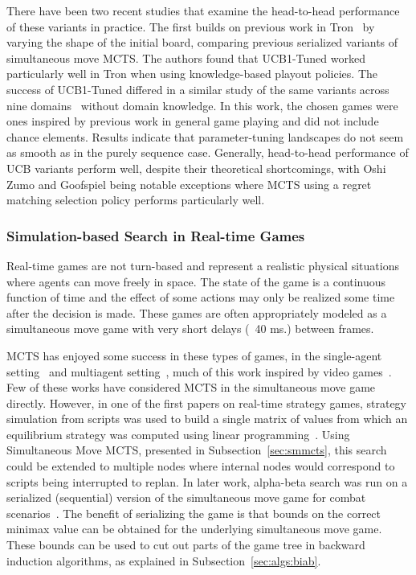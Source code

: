 
There have been two recent studies that examine the head-to-head performance of these variants in practice. 
The first builds on previous work in Tron~\cite{Lanctot13Tron} by varying the shape of the initial board, 
comparing previous serialized variants of simultaneous move MCTS. The authors found that UCB1-Tuned worked 
particularly well in Tron when using knowledge-based playout policies. The success of UCB1-Tuned differed in 
a similar study of the same variants across nine domains~\cite{Tak14smmcts} without domain knowledge. In this 
work, the chosen games were ones inspired by previous work in general game playing and did not include chance elements. 
Results indicate that parameter-tuning landscapes do not seem as smooth as in the purely sequence case. 
Generally, head-to-head performance of UCB variants perform well, despite their theoretical shortcomings, with Oshi Zumo and 
Goofspiel being notable exceptions where MCTS using a regret matching selection policy performs particularly well.

\subsubsection{Simulation-based Search in Real-time Games}


Real-time games are not turn-based and represent a realistic physical situations where agents can move freely in space. 
The state of the game is a continuous function of time and the effect of some actions may only be realized some time 
after the decision is made. These games are often appropriately modeled as a simultaneous move game with very short 
delays (~40 ms.) between frames. 

MCTS has enjoyed some success in these types of games, in the single-agent 
setting~\cite{Pepels14Monte,Perez14PTSP} and multiagent setting~\cite{Balla09UCT}, much of this work inspired by video 
games~\cite{Cowling13Video,BellemareNVB13,Ontanon13RTSSurvey}. Few of these works have considered MCTS
in the simultaneous move game directly. 
However, in one of the first papers on real-time strategy games, strategy simulation
from scripts was used to build a single matrix of values from which an equilibrium strategy was 
computed using linear programming~\cite{Sailor07adversarial}.  
Using Simultaneous Move MCTS, presented in Subsection~\ref{sec:smmcts}, this search could be extended 
to multiple nodes where internal nodes would correspond to scripts being interrupted to replan. 
In later work, alpha-beta search was run on a serialized (sequential) version of the 
simultaneous move game for combat scenarios~\cite{Churchill2012Fast}. The benefit of serializing the game is that bounds 
on the correct minimax value can be obtained for the underlying simultaneous move game. These bounds can be used to cut out
parts of the game tree in backward induction algorithms, as explained in Subsection~\ref{sec:algs:biab}.





